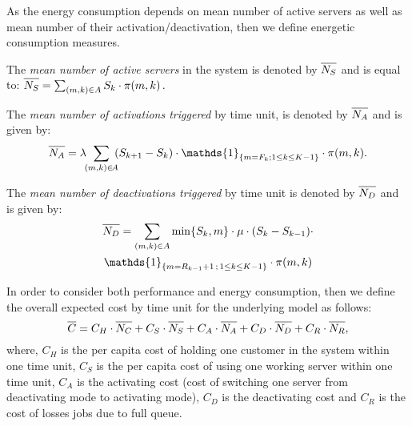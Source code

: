 \documentclass[conference]{IEEEtran}
\begin{document}
As the energy consumption depends on mean number of active servers as well as mean number of
their activation/deactivation, then  we define energetic consumption measures.

The \emph{mean number of active servers} in the system is denoted by $\overline{\mathstrut N_{S}}$ and is equal to:
\(
\overline{\mathstrut N_{S}}=\sum_{(m,k) \in A}S_{k} \cdot \pi(m,k) \, .
\)

The
\emph{mean number of activations triggered} by time unit,
is denoted by $\overline{\mathstrut N_{A}}$ and is given by:
\begin{equation*}
\overline{\mathstrut N_{A}}=
\lambda \! \! \sum_{(m,k) \in \! A} \! \! (S_{k+1} -  S_{k}) \cdot \mathds{1}_{\{m=F_k ; 1 \leq k \leq K-1\}} \cdot \pi(m,k) .
\end{equation*}

The
\emph{mean number of deactivations triggered} by time unit is denoted by $\overline{\mathstrut N_{D}}$ and is given by:
\begin{multline*}
\overline{\mathstrut N_{D}}=\sum_{(m,k) \in A} \min\{S_{k},m\} \cdot \mu \cdot (S_{k}-S_{k-1}) \cdot \\
\mathds{1}_{\{m=R_{k-1}+1 \, \mbox{;} \, 1 \leq k \leq K-1\}}
\cdot \pi(m,k)
\end{multline*}


In order to consider both performance and energy consumption, then we define the overall expected cost
by time unit for the underlying model as follows:
\begin{equation*}
    \overline{\mathstrut C}=C_{H} \cdot \overline{\mathstrut N_{C}}+C_{S} \cdot \overline{\mathstrut N_{S}}+C_{A}
      \cdot \overline{\mathstrut N_{A}}+C_{D} \cdot \overline{\mathstrut N_{D}}+C_{R} \cdot \overline{\mathstrut N_{R}},
\end{equation*}
where, $C_{H}$ is the per capita cost of holding one customer in the system within one time unit,
$C_{S}$ is the per capita cost of using one working server within one time unit,
$C_{A}$ is the activating cost (cost of switching one server from deactivating mode to activating mode),
$C_{D}$ is the deactivating cost  and $C_{R}$ is the cost of losses jobs due to full queue.
\end{document}
